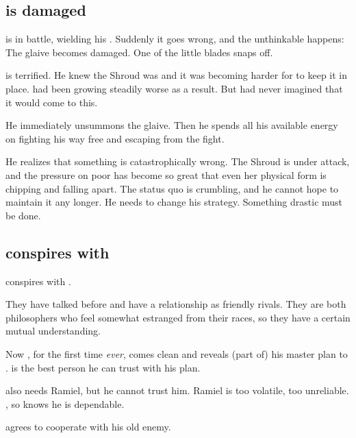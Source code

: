 \begin{garbage}
\subsection{\Rystessakhin{} is damaged}
\Ishnaruchaefir{} is in battle, wielding his . 
Suddenly it goes wrong, and the unthinkable happens: 
The glaive becomes damaged. 
One of the little blades snaps off. 

\Ishnaruchaefir{} is terrified. 
He knew the Shroud was  and it was becoming harder for \Rystessakhin{} to keep it in place. 
 had been growing steadily worse as a result. 
But had never imagined that it would come to this. 

He immediately unsummons the glaive. 
Then he spends all his available energy on fighting his way free and escaping from the fight. 

He realizes that something is catastrophically wrong. 
The Shroud is under attack, and the pressure on poor \Rystessakhin{} has become so great that even her physical form is chipping and falling apart. 
The status quo is crumbling, and he cannot hope to maintain it any longer. 
He needs to change his strategy.
Something drastic must be done. 








\subsection{\Azraid{} conspires with \Ishnaruchaefir}
\Azraid{} conspires with \Ishnaruchaefir. 

They have talked before and have a relationship as friendly rivals. 
They are both philosophers who feel somewhat estranged from their races, so they have a certain mutual understanding. 

Now \Azraid{}, for the first time \emph{ever}, comes clean and reveals (part of) his master plan to \Ishnaruchaefir. 
\Ishnaruchaefir{} is the best person he can trust with his plan. 

\Azraid{} also needs Ramiel, but he cannot trust him.
Ramiel is too volatile, too unreliable. 
\Ishnaruchaefir{} , so \Azraid{} knows he is dependable.

\Ishnaruchaefir{} agrees to cooperate with his old enemy. 


\end{garbage}
